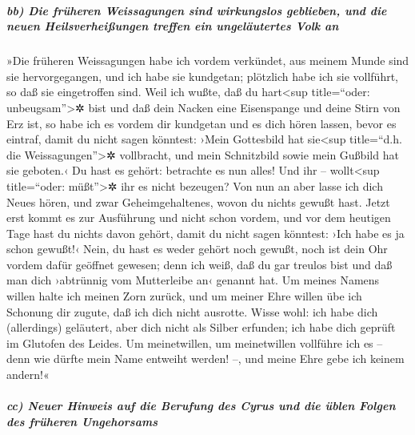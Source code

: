 \hypertarget{bb-die-fruxfcheren-weissagungen-sind-wirkungslos-geblieben-und-die-neuen-heilsverheiuxdfungen-treffen-ein-ungeluxe4utertes-volk-an}{%
\subparagraph{bb) Die früheren Weissagungen sind wirkungslos geblieben,
und die neuen Heilsverheißungen treffen ein ungeläutertes Volk
an}\label{bb-die-fruxfcheren-weissagungen-sind-wirkungslos-geblieben-und-die-neuen-heilsverheiuxdfungen-treffen-ein-ungeluxe4utertes-volk-an}}

»Die früheren Weissagungen habe ich vordem verkündet, aus
meinem Munde sind sie hervorgegangen, und ich habe sie kundgetan;
plötzlich habe ich sie vollführt, so daß sie eingetroffen sind.
Weil ich wußte, daß du hart\textless sup title=``oder:
unbeugsam''\textgreater✲ bist und daß dein Nacken eine Eisenspange und
deine Stirn von Erz ist, so habe ich es vordem dir
kundgetan und es dich hören lassen, bevor es eintraf, damit du nicht
sagen könntest: ›Mein Gottesbild hat sie\textless sup title=``d.h. die
Weissagungen''\textgreater✲ vollbracht, und mein Schnitzbild sowie mein
Gußbild hat sie geboten.‹ Du hast es gehört: betrachte es
nun alles! Und ihr -- wollt\textless sup title=``oder:
müßt''\textgreater✲ ihr es nicht bezeugen? Von nun an aber lasse ich
dich Neues hören, und zwar Geheimgehaltenes, wovon du nichts gewußt
hast. Jetzt erst kommt es zur Ausführung und nicht schon
vordem, und vor dem heutigen Tage hast du nichts davon gehört, damit du
nicht sagen könntest: ›Ich habe es ja schon gewußt!‹ Nein,
du hast es weder gehört noch gewußt, noch ist dein Ohr vordem dafür
geöffnet gewesen; denn ich weiß, daß du gar treulos bist und daß man
dich ›abtrünnig vom Mutterleibe an‹ genannt hat. Um meines
Namens willen halte ich meinen Zorn zurück, und um meiner Ehre willen
übe ich Schonung dir zugute, daß ich dich nicht ausrotte.
Wisse wohl: ich habe dich (allerdings) geläutert, aber
dich nicht als Silber erfunden; ich habe dich geprüft im Glutofen des
Leides. Um meinetwillen, um meinetwillen vollführe ich es
-- denn wie dürfte mein Name entweiht werden! --, und meine Ehre gebe
ich keinem andern!«

\hypertarget{cc-neuer-hinweis-auf-die-berufung-des-cyrus-und-die-uxfcblen-folgen-des-fruxfcheren-ungehorsams}{%
\subparagraph{cc) Neuer Hinweis auf die Berufung des Cyrus und die üblen
Folgen des früheren
Ungehorsams}\label{cc-neuer-hinweis-auf-die-berufung-des-cyrus-und-die-uxfcblen-folgen-des-fruxfcheren-ungehorsams}}


